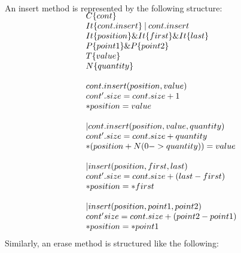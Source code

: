 \documentclass[a4paper]{llncs}
\begin{document}
	An insert method is represented by the following structure:\\
\[\begin{array}{r@{\:\:}c@{\:\:}l}\label{insert-model}
\\[-5ex]
\  & & \: C\{cont\} \\
	 & &	\: It\{cont.insert\} \: | \: cont.insert \\
	 & &	\: It\{position\} \& It\{first\} \& It\{last\} \\
	 & &	\: P\{point1\} \& P\{point2\} \\
	 & &	\: T\{value\} \\
	 & &	\: N\{quantity\} \\
	 & &	\: \\
	 & &	\: cont.insert (position, value) \\
	 &  &	 \: cont'.size = cont.size + 1 \\
	 &  &	 \: *position = value \\
	 & &	\: \\
	 & &	\: |cont.insert(position, value, quantity) \\
	 &  &	 \: cont'.size = cont.size + quantity \\
	 &  &	 \: *(position + N(0 -> quantity)) = value \\
	 & &	\: \\
	 & &	\: |insert(position, first, last) \\
	 &  &	 \: cont'.size = cont.size +( last - first) \\
	 &  &	 \: *position = *first \\
	 & &	\: \\
	 & &	\: |insert(position, point1, point2) \\
	 &  &	 \: cont'size = cont.size + (point2 - point1) \\
	 &  &	 \: *position = *point1 \\
\end{array}
\]
%
	Similarly, an erase method is structured like the following:\\
%
\end{document}
